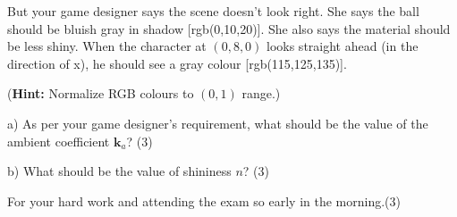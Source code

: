 \documentclass[11pt,answers]{exam}
\begin{document}
\begin{questions}
{But your game designer says the
scene doesn't look right. She says the ball should be bluish gray in shadow [rgb(0,10,20)].
She also says the material should be less shiny. When the character at $(0,8,0)$ looks straight
ahead (in the direction of x), he should see a gray colour [rgb(115,125,135)].

(\textbf{Hint:} Normalize RGB colours to $(0, 1)$ range.)

a) As per your game designer's requirement, what should be the value of the ambient coefficient $\mathbf{k}_a$? \hfill (3)

\vspace{8cm}

b) What should be the value of shininess $n$? \hfill (3)
}
\vspace{12cm}
\question[]For your hard work and attending the exam so early in the morning.\hfill (3)

\end{questions}
\end{document}

